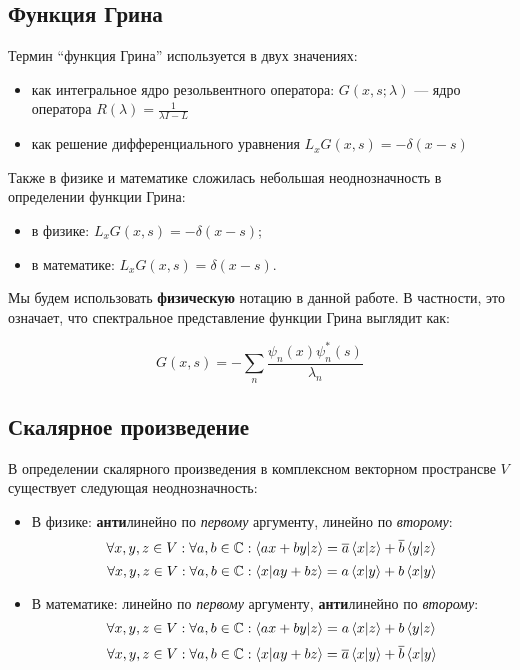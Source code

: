 \subsection{Функция Грина}
Термин ``функция Грина'' используется в двух значениях:

\begin{itemize}
\item как интегральное ядро резольвентного оператора: $G(x, s; \lambda)$ — ядро оператора $R(\lambda) = \frac{1}{\lambda I - L}$ 
\item как решение дифференциального уравнения $L_x G(x, s) = -\delta(x - s)$
\end{itemize}

Также в физике и математике сложилась небольшая неоднозначность в определении функции Грина:

\begin{itemize}
\item в физике: $L_x G(x, s) = -\delta(x - s)$;
\item в математике: $L_x G(x, s) = \delta(x - s)$.
\end{itemize} 

Мы будем использовать \textbf{физическую} нотацию в данной работе. В частности, это означает, что спектральное представление функции Грина выглядит как: 

\[
G(x, s) = -\sum\limits_n \frac{\psi_n(x) \psi_n^*(s)}{\lambda_n}
\]

\subsection{Скалярное произведение}
В определении скалярного произведения в комплексном векторном пространсве $V$ существует следующая неоднозначность:

\begin{itemize}
\item В физике: \textbf{анти}линейно по \textit{первому} аргументу, линейно по \textit{второму}:
\[
\forall x, y, z \in V: \forall a, b \in \mathbb{C}: \ip{ax + by}{z} = \cconj{a} \ip{x}{z} + \cconj{b} \ip{y}{z}
\]
\[
\forall x, y, z \in V: \forall a, b \in \mathbb{C}: \ip{x}{ay + bz} = a \ip{x}{y} + b \ip{x}{y}
\]
\item В математике: линейно по \textit{первому} аргументу, \textbf{анти}линейно по \textit{второму}:
\[
\forall x, y, z \in V: \forall a, b \in \mathbb{C}: \ip{ax + by}{z} = a \ip{x}{z} + b \ip{y}{z}
\]
\[
\forall x, y, z \in V: \forall a, b \in \mathbb{C}: \ip{x}{ay + bz} = \cconj{a} \ip{x}{y} + \cconj{b} \ip{x}{y}
\]
\end{itemize}

